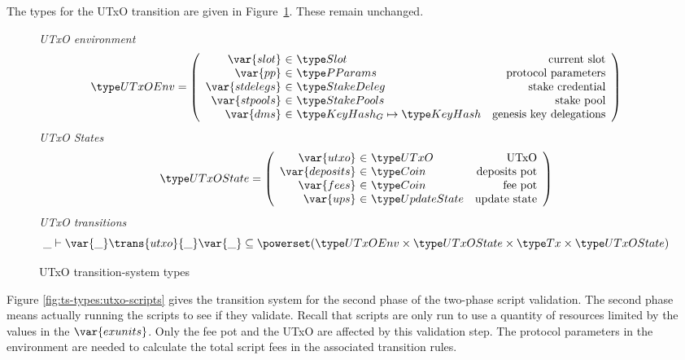 The types for the UTxO transition are given in Figure~\ref{fig:ts-types:utxo-shelley}.
These remain unchanged.

\begin{figure}[htb]
  \emph{UTxO environment}
  \begin{equation*}
    \UTxOEnv =
    \left(
      \begin{array}{r@{~\in~}lr}
        \var{slot} & \Slot & \text{current slot}\\
        \var{pp} & \PParams & \text{protocol parameters}\\
        \var{stdelegs} & \StakeDeleg & \text{stake credential}\\
        \var{stpools} & \StakePools & \text{stake pool}\\
        \var{dms} & \KeyHashGen\mapsto\KeyHash & \text{genesis key delegations} \\
      \end{array}
    \right)
  \end{equation*}
  \emph{UTxO States}
  \begin{equation*}
    \UTxOState =
    \left(
      \begin{array}{r@{~\in~}lr}
        \var{utxo} & \UTxO & \text{UTxO}\\
        \var{deposits} & \Coin & \text{deposits pot}\\
        \var{fees} & \Coin & \text{fee pot}\\
        \var{ups} & \UpdateState & \text{update state}\\
      \end{array}
    \right)
  \end{equation*}
  \emph{UTxO transitions}
  \begin{equation*}
    \_ \vdash
    \var{\_} \trans{utxo}{\_} \var{\_}
    \subseteq \powerset (\UTxOEnv \times \UTxOState \times \Tx \times \UTxOState)
  \end{equation*}
  \caption{UTxO transition-system types}
  \label{fig:ts-types:utxo-shelley}
\end{figure}

Figure \ref{fig:ts-types:utxo-scripts} gives the transition system for the second phase of
the two-phase script validation. The second phase means actually running
the scripts to see if they validate. Recall that scripts are only run to use a quantity of
resources limited by the values in the $\var{exunits}$. Only the fee pot and the
UTxO are affected by this validation step. The protocol parameters in the
environment are needed to calculate the total script fees in the associated
transition rules.


